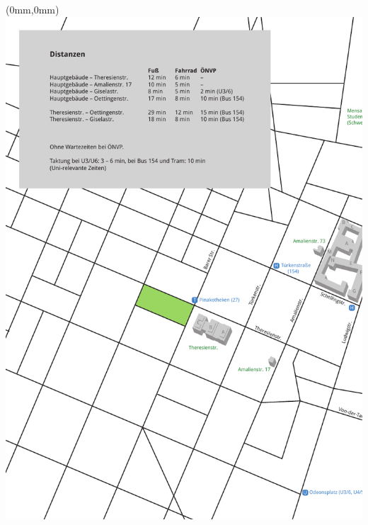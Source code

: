 \documentclass[twoside,12pt,parskip=half-]{scrartcl}
\begin{document}
\thispagestyle{empty}
\begin{textblock*}{\paperwidth}(0mm,0mm)
   \noindent\includegraphics[width=\paperwidth,height=\paperheight]{lageplan_links}
\end{textblock*}
\mbox{}

\clearpage
\end{document}

